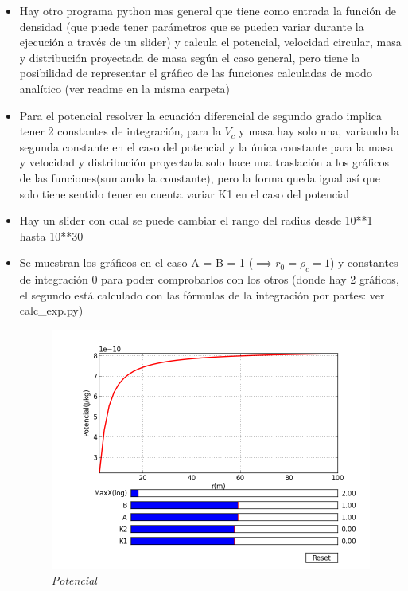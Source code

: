 \documentclass[12pt]{book}
\begin{document}
\begin{itemize}

	\item Hay otro programa python mas general que tiene como entrada la función de densidad (que puede tener parámetros que se pueden variar durante la ejecución a través de un slider) y calcula el potencial, velocidad circular, masa y distribución proyectada de masa según el caso general, pero tiene la posibilidad de representar el gráfico de las funciones calculadas de modo analítico (ver readme en la misma carpeta)
\item Para el potencial resolver la ecuación diferencial de segundo grado implica tener 2 constantes de integración, para la $V_c$ y masa hay solo una, variando la segunda constante en el caso del potencial y la única constante para la masa y velocidad y distribución proyectada solo hace una traslación a los gráficos de las funciones(sumando la constante), pero la forma queda igual así que solo tiene sentido tener en cuenta variar K1 en el caso del potencial 
\item Hay un slider con cual se puede cambiar el rango del radius desde 10**1 hasta 10**30
\item Se muestran los gráficos en el caso A = B = 1 ($\implies r_0= \rho_c =1$) y constantes de integración 0 para poder comprobarlos con los otros (donde hay 2 gráficos, el segundo está calculado con las fórmulas de la integración por partes: ver calc\_exp.py)

\begin{figure}[!ht]
 \centering
 \includegraphics[scale=0.33]{pt_pot_A1_B1.png}
 \caption{\emph{Potencial}}
\end{figure}


\end{itemize}
\end{document}
